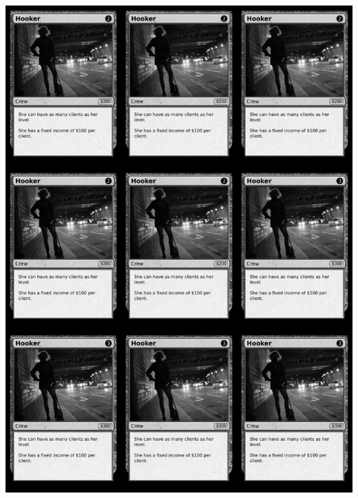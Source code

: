 \documentclass[a4paper]{article}
\begin{document}
\begin{center}
	\centering
	\includegraphics[width=190.5mm,height=266.7mm]{output/temp/page15.png}
\end{center}
\end{document}
